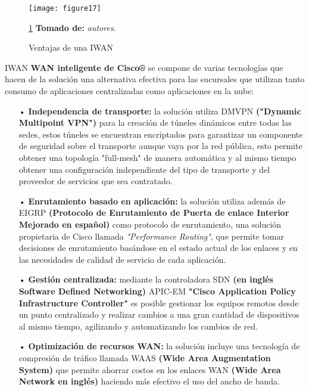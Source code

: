 \begin{figure}[htbp]
  \centering
    {\texttt{[image: figure17]}}%
  \caption{Ventajas de una IWAN}
  \ref{fig:iwan} \textbf{Tomado de:} \textit{autores}.
  \label{fig:iwan}
\end{figure}
IWAN \textbf{WAN inteligente de Cisco®} se compone de varias tecnologías que hacen de la solución una alternativa efectiva para las sucursales que utilizan tanto consumo de aplicaciones centralizadas como aplicaciones en la nube:
\begin{itemize}
\item[•]\textbf{Independencia de transporte:} la solución utiliza DMVPN \textbf{("Dynamic Multipoint VPN")} para la creación de túneles dinámicos entre todas las sedes, estos túneles se encuentran encriptados para garantizar un componente de seguridad sobre el transporte aunque vaya por la red pública, esto permite obtener una topología "full-mesh" de manera automática y al mismo tiempo obtener una configuración independiente del tipo de transporte y del proveedor de servicios que sea contratado.
\item[•]\textbf{Enrutamiento basado en aplicación:} la solución utiliza además de EIGRP \textbf{(Protocolo de Enrutamiento de Puerta de enlace Interior Mejorado en español)} como protocolo de enrutamiento, una solución propietaria de Cisco llamada  \textit{"Performance Routing"}, que permite tomar decisiones de enrutamiento basándose en el estado actual de los enlaces y en las necesidades de calidad de servicio de cada aplicación.
\item[•]\textbf{Gestión centralizada:} mediante la controladora SDN \textbf{(en inglés Software Defined Networking)} APIC-EM \textbf{"Cisco Application Policy Infrastructure Controller"} es posible gestionar los equipos remotos desde un punto centralizado y realizar cambios a una gran cantidad de dispositivos al mismo tiempo, agilizando y automatizando los cambios de red.
\item[•]\textbf{Optimización de recursos WAN:} la solución incluye una tecnología de compresión de tráfico llamada WAAS \textbf{(Wide Area Augmentation System)} que permite ahorrar costos en los enlaces WAN \textbf{(Wide Area Network en inglés)} haciendo más efectivo el uso del ancho de banda.
\end{itemize}

